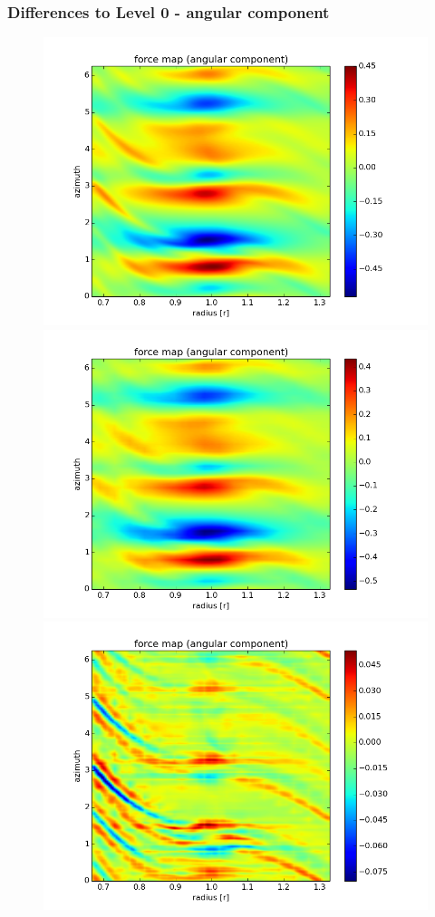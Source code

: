 \documentclass{beamer}
\begin{document}
\begin{frame}
 \frametitle{Differences to Level 0 - angular component}
 \begin{figure}[H]
  \centering
  \includegraphics[width=.4\textwidth]{angular_force.png} \includegraphics[width=.4\textwidth]{angular_refined_lvl3.png} \\
  \includegraphics[width=.4\textwidth]{angular_refined_diff3.png}
 \end{figure} 
\end{frame}
\end{document}
